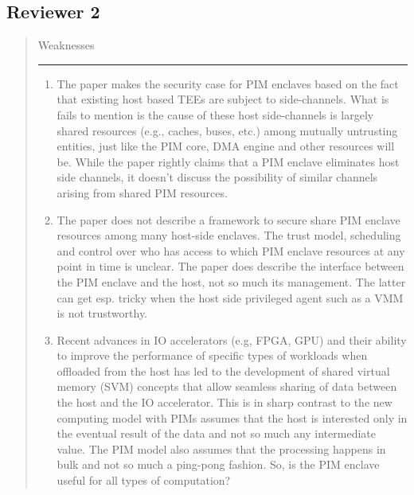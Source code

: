 \documentclass[11pt]{article}
\begin{document}
\subsection{Reviewer 2}
\label{sec:orgbd4493e}
\begin{quote}
Weaknesses

\noindent\rule{\textwidth}{0.5pt}
\begin{enumerate}
\item The paper makes the security case for PIM enclaves based on the fact that existing host based TEEs are subject to side-channels. What is fails to mention is the cause of these host side-channels is largely shared resources (e.g., caches, buses, etc.) among mutually untrusting entities, just like the PIM core, DMA engine and other resources will be. While the paper rightly claims that a PIM enclave eliminates host side channels, it doesn't discuss the possibility of similar channels arising from shared PIM resources.

\item The paper does not describe a framework to secure share PIM enclave resources among many host-side enclaves. The trust model, scheduling and control over who has access to which PIM enclave resources at any point in time is unclear. The paper does describe the interface between the PIM enclave and the host, not so much its management. The latter can get esp. tricky when the host side privileged agent such as a VMM is not trustworthy.

\item Recent advances in IO accelerators (e.g, FPGA, GPU) and their ability to improve the performance of specific types of workloads when offloaded from the host has led to the development of shared virtual memory (SVM) concepts that allow seamless sharing of data between the host and the IO accelerator. This is in sharp contrast to the new computing model with PIMs assumes that the host is interested only in the eventual result of the data and not so much any intermediate value. The PIM model also assumes that the processing happens in bulk and not so much a ping-pong fashion. So, is the PIM enclave useful for all types of computation?


\end{enumerate}
\end{quote}
\end{document}

